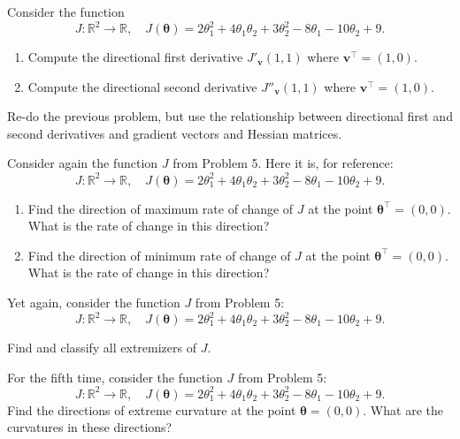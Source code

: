 \documentclass[12pt,reqno]{amsart}
\begin{document}
\vfill
\newpage
\prob Consider the function
	\[J: \mathbb{R}^2 \to \mathbb{R}, \quad J(\boldsymbol{\theta}) = 2\theta_1^2 + 4\theta_1\theta_2 + 3\theta_2^2 -8\theta_1 - 10\theta_2 + 9.
	\]

\begin{enumerate}
\item Compute the directional first derivative $J'_\mathbf{v}(1,1)$ where $\mathbf{v}^\intercal = (1,0)$.\vfill
\item Compute the directional second derivative $J''_{\mathbf{v}}(1,1)$ where $\mathbf{v}^\intercal = (1,0)$.
\end{enumerate}







\vfill
\prob Re-do the previous problem, but use the relationship between directional first and second derivatives and gradient vectors and Hessian matrices.








\vfill
\newpage
\prob Consider again the function $J$ from Problem 5. Here it is, for reference:
	\[J: \mathbb{R}^2 \to \mathbb{R}, \quad J(\boldsymbol{\theta}) = 2\theta_1^2 + 4\theta_1\theta_2 + 3\theta_2^2 -8\theta_1 - 10\theta_2 + 9.
	\]


\begin{enumerate}
\item Find the direction of maximum rate of change of $J$ at the point $\boldsymbol{\theta}^\intercal = (0,0)$. What is the rate of change in this direction?\vfill
\item Find the direction of minimum rate of change of $J$ at the point $\boldsymbol{\theta}^\intercal = (0,0)$. What is the rate of change in this direction?
\end{enumerate}






\vfill
\prob Yet again, consider the function $J$ from Problem 5:
	\[J: \mathbb{R}^2 \to \mathbb{R}, \quad J(\boldsymbol{\theta}) = 2\theta_1^2 + 4\theta_1\theta_2 + 3\theta_2^2 -8\theta_1 - 10\theta_2 + 9.
	\]

Find and classify all extremizers of $J$.









\vfill
\prob For the fifth time, consider the function $J$ from Problem 5:
	\[J: \mathbb{R}^2 \to \mathbb{R}, \quad J(\boldsymbol{\theta}) = 2\theta_1^2 + 4\theta_1\theta_2 + 3\theta_2^2 -8\theta_1 - 10\theta_2 + 9.
	\]
Find the directions of extreme curvature at the point $\boldsymbol{\theta} = (0,0)$. What are the curvatures in these directions?
\end{document}
